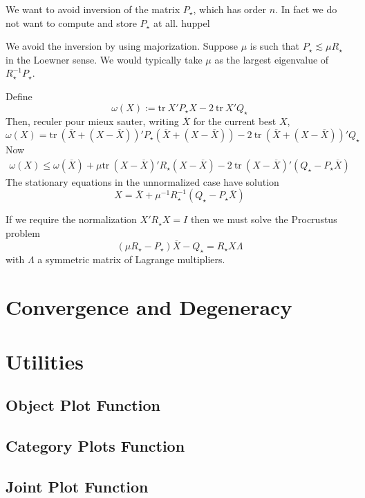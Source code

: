 \documentclass[
  12pt,
]{article}
\begin{document}
We want to avoid inversion of the matrix \(P_\star\), which has order \(n\). In fact we do not want to compute and store \(P_\star\) at all. huppel

We avoid the inversion by using majorization. Suppose \(\mu\) is such that \(P_\star\lesssim\mu R_\star\) in the Loewner sense. We would typically take \(\mu\) as the largest eigenvalue of \(R_\star^{-1}P_\star\).

Define
\[
\omega(X):=\text{tr}\ X'P_\star X-2\ \text{tr}\ X'Q_\star
\]
Then, reculer pour mieux sauter, writing \(\overline{X}\) for the current best
\(X\),
\[
\omega(X)=\text{tr}\ (\overline X+(X-\overline X))'P_\star(\overline X+(X-\overline X))-2\ \text{tr}\ (\overline X+(X-\overline X))'Q_\star
\]
Now
\begin{multline}
\omega(X)\leq\omega(\overline X)+
\mu\text{tr}\ (X-\overline X)'R_\star(X-\overline X)-2\ \text{tr}\ (X-\overline X)'(Q_\star-P_\star\overline X)
\end{multline}
The stationary equations in the unnormalized case have solution
\[
X=\overline X+\mu^{-1}R_\star^{-1}(Q_\star-P_\star\overline X)
\]

If we require the normalization \(X'R_\star X=I\) then we must solve the Procrustus problem
\[
(\mu R_\star-P_\star)\overline X - Q_\star=R_\star X\Lambda
\]
with \(\Lambda\) a symmetric matrix of Lagrange multipliers.

\section{Convergence and Degeneracy}\label{convergence-and-degeneracy}

\section{Utilities}\label{utilities}

\subsection{Object Plot Function}\label{object-plot-function}

\subsection{Category Plots Function}\label{category-plots-function}

\subsection{Joint Plot Function}\label{joint-plot-function}
\end{document}
